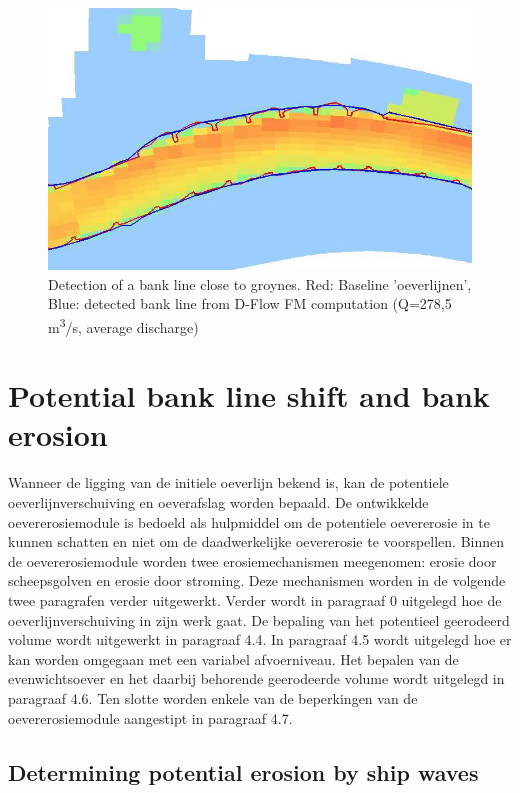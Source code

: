 \begin{figure}
\includegraphics[width=\textwidth]{figures/Fig3-3.png}
\caption{Detection of a bank line close to groynes.
Red: Baseline 'oeverlijnen', Blue: detected bank line from D-Flow FM computation (Q=278,5 m\textsuperscript{3}/s, average discharge)}
\label{Fig3.3}
\end{figure}


\chapter{Potential bank line shift and bank erosion}

Wanneer de ligging van de initiele oeverlijn bekend is, kan de potentiele oeverlijnverschuiving en oeverafslag worden bepaald.
De ontwikkelde oevererosiemodule is bedoeld als hulpmiddel om de potentiele oevererosie in te kunnen schatten en niet om de daadwerkelijke oevererosie te voorspellen.
Binnen de oevererosiemodule worden twee erosiemechanismen meegenomen: erosie door scheepsgolven en erosie door stroming.
Deze mechanismen worden in de volgende twee paragrafen verder uitgewerkt.
Verder wordt in paragraaf 0 uitgelegd hoe de oeverlijnverschuiving in zijn werk gaat.
De bepaling van het potentieel geerodeerd volume wordt uitgewerkt in paragraaf 4.4.
In paragraaf 4.5 wordt uitgelegd hoe er kan worden omgegaan met een variabel afvoerniveau.
Het bepalen van de evenwichtsoever en het daarbij behorende geerodeerde volume wordt uitgelegd in paragraaf 4.6.
Ten slotte worden enkele van de beperkingen van de oevererosiemodule aangestipt in paragraaf 4.7.

\section{Determining potential erosion by ship waves}

